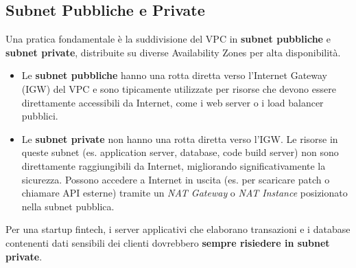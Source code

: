 \subsection{Subnet Pubbliche e Private}
\label{subsec:subnets}
Una pratica fondamentale è la suddivisione del VPC in \textbf{subnet pubbliche} e \textbf{subnet private}, distribuite su diverse Availability Zones per alta disponibilità.
\begin{itemize}
    \item Le \textbf{subnet pubbliche} hanno una rotta diretta verso l'Internet Gateway (IGW) del VPC e sono tipicamente utilizzate per risorse che devono essere direttamente accessibili da Internet, come i web server o i load balancer pubblici.
    \item Le \textbf{subnet private} non hanno una rotta diretta verso l'IGW. Le risorse in queste subnet (es. application server, database, code build server) non sono direttamente raggiungibili da Internet, migliorando significativamente la sicurezza. Possono accedere a Internet in uscita (es. per scaricare patch o chiamare API esterne) tramite un \textit{NAT Gateway} o \textit{NAT Instance} posizionato nella subnet pubblica.
\end{itemize}
Per una startup fintech, i server applicativi che elaborano transazioni e i database contenenti dati sensibili dei clienti dovrebbero \textbf{sempre risiedere in subnet private}.

